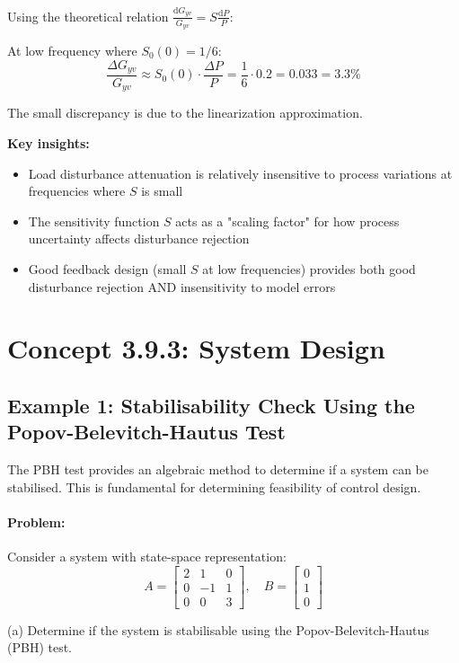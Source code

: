 \documentclass[11pt,a4paper]{article}
\begin{document}
Using the theoretical relation $\frac{\mathrm{d}G_{yv}}{G_{yv}} = S\frac{\mathrm{d}P}{P}$:

At low frequency where $S_0(0) = 1/6$:
\[
\frac{\Delta G_{yv}}{G_{yv}} \approx S_0(0) \cdot \frac{\Delta P}{P} = \frac{1}{6} \cdot 0.2 = 0.033 = 3.3\%
\]

The small discrepancy is due to the linearization approximation.

\textbf{Key insights:}
\begin{itemize}
\item Load disturbance attenuation is relatively insensitive to process variations at frequencies where $S$ is small
\item The sensitivity function $S$ acts as a "scaling factor" for how process uncertainty affects disturbance rejection
\item Good feedback design (small $S$ at low frequencies) provides both good disturbance rejection AND insensitivity to model errors
\end{itemize}

\section{Concept 3.9.3: System Design}

\subsection{Example 1: Stabilisability Check Using the Popov-Belevitch-Hautus Test}

The PBH test provides an algebraic method to determine if a system can be stabilised. This is fundamental for determining feasibility of control design.

\paragraph{Problem:}
Consider a system with state-space representation:
\[
A = \begin{bmatrix} 2 & 1 & 0 \\ 0 & -1 & 1 \\ 0 & 0 & 3 \end{bmatrix}, \quad
B = \begin{bmatrix} 0 \\ 1 \\ 0 \end{bmatrix}
\]

(a) Determine if the system is stabilisable using the Popov-Belevitch-Hautus (PBH) test.
\end{document}
